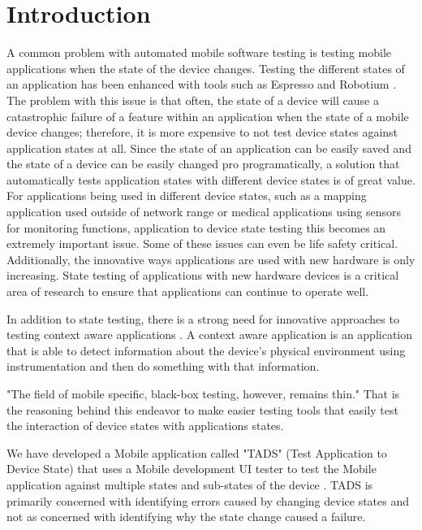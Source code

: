 \section{Introduction}
A common problem with automated mobile software testing is testing mobile applications when the state of the device changes.  Testing the different states of an application has been enhanced with tools such as Espresso and Robotium \cite{optimusinformationinc2016}. The problem with this issue is that often, the state of a device will cause a catastrophic failure of a feature within an application when the state of a mobile device changes; therefore, it is more expensive to not test device states against application states at all.  Since the state of an application can be easily saved and the state of a device can be easily changed pro programatically, a solution that automatically tests application states with different device states is of great value.  For applications being used in different device states, such as a mapping application used outside of network range or medical applications using sensors for monitoring functions, application to device state testing this becomes an extremely important issue.  Some of these issues can even be life safety critical.  Additionally, the innovative ways applications are used with new hardware is only increasing.  State testing of applications with new hardware devices is a critical area of research to ensure that applications can continue to operate well. 

In addition to state testing, there is a strong need for innovative approaches to testing context aware applications \cite{Luo:2017:TLT:3139486.3130945}.  A context aware application is an application that is able to detect information about the device's physical environment using instrumentation and then do something with that information.  

"The field of mobile specific, black-box testing, however, remains thin." \cite{paulovsky2017high}  That is the reasoning behind this endeavor to make easier testing tools that easily test the interaction of device states with applications states.  

We have developed a Mobile application called "TADS" (Test Application to Device State) that uses a Mobile development UI tester to test the Mobile application against multiple states and sub-states of the device \cite{366932}.  TADS is primarily concerned with identifying errors caused by changing device states and not as concerned with identifying why the state change caused a failure.

